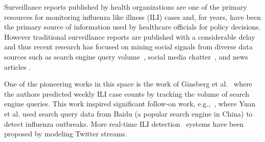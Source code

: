 Surveillance reports published by health organizations are one of the
primary resources for monitoring influenza like illness (ILI) cases and,
for years, have been the primary source of information used by healthcare
officials for policy decisions. However traditional surveillance
reports are published with a considerable delay and thus recent research
has focused on mining social signals from diverse data sources such as
search engine query volume~\cite{ref1, ref2}, social
media chatter~\cite{ref3, ref4, ref5, ref6, ref7}, 
and news articles \cite{ref8}.




One of the pioneering works in this 
space is the work of
Ginsberg et al.~\cite{ref2} where the authors 
predicted weekly ILI case counts
by tracking the volume of search engine queries. This work 
inspired significant follow-on work, e.g.,~\cite{ref1}, where Yuan 
et al. used search query data from Baidu (a popular search 
engine in China) to detect influenza outbreaks. 
More real-time ILI detection~\cite{ref4} systems have been proposed 
by modeling Twitter streams.

